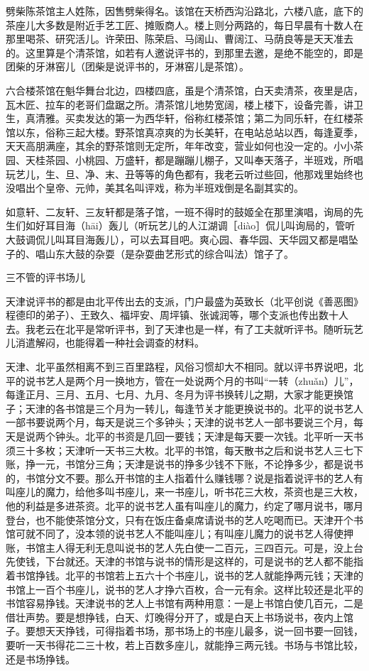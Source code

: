 \documentclass[12pt,UTF8]{ctexbook}
\begin{document}
劈柴陈茶馆主人姓陈，因售劈柴得名。该馆在天桥西沟沿路北，六楼八底，底下的茶座儿大多数是附近手艺工匠、摊贩商人。楼上则分两路的，每日早晨有十数人在那里喝茶、研究活儿。许荣田、陈荣启、马阔山、曹阔江、马荫良等是天天准去的。这里算是个清茶馆，如若有人邀说评书的，到那里去邀，是绝不能空的，即是团柴的牙淋窑儿（团柴是说评书的，牙淋窑儿是茶馆）。

六合楼茶馆在魁华舞台北边，四楼四底，虽是个清茶馆，白天卖清茶，夜里是店，瓦木匠、拉车的老哥们盘踞之所。清茶馆儿地势宽阔，楼上楼下，设备完善，讲卫生，真清雅。买卖发达的第一为西华轩，俗称红楼茶馆；第二为同乐轩，在红楼茶馆以东，俗称三起大楼。野茶馆真凉爽的为长美轩，在电站总站以西，每逢夏季，天天高朋满座，其余的野茶馆则无定所，年年改变，营业如何也没一定的。小小茶园、天桂茶园、小桃园、万盛轩，都是蹦蹦儿棚子，又叫奉天落子，半班戏，所唱玩艺儿，生、旦、净、末、丑等等的角色都有，我老云听过些回，他那戏里始终也没唱出个皇帝、元帅，美其名叫评戏，称为半班戏倒是名副其实的。

如意轩、二友轩、三友轩都是落子馆，一班不得时的鼓姬全在那里演唱，询局的先生们如好耳目海（hāi）轰儿（听玩艺儿的人江湖调［diào］侃儿叫询局的，管听大鼓调侃儿叫耳目海轰儿），可以去耳目吧。爽心园、春华园、天华园又都是唱坠子的、唱山东大鼓的杂耍（是杂耍曲艺形式的综合叫法）馆子了。





三不管的评书场儿


天津说评书的都是由北平传出去的支派，门户最盛为英致长（北平创说《善恶图》程德印的弟子）、王致久、福坪安、周坪镇、张诚润等，哪个支派也传出数十人去。我老云在北平是常听评书，到了天津也是一样，有了工夫就听评书。随听玩艺儿消遣解闷，也能得着一种社会调查的材料。

天津、北平虽然相离不到三百里路程，风俗习惯却大不相同。就以评书界说吧，北平的说书艺人是两个月一换地方，管在一处说两个月的书叫“一转（zhuǎn）儿”，每逢正月、三月、五月、七月、九月、冬月为评书换转儿之期，大家才能更换馆子；天津的各书馆是三个月为一转儿，每逢节关才能更换说书的。北平的说书艺人一部书要说两个月，每天是说三个多钟头；天津的说书艺人一部书要说三个月，每天是说两个钟头。北平的书资是几回一要钱；天津是每天要一次钱。北平听一天书须三十多枚；天津听一天书三大枚。北平的书馆，每天散书之后和说书艺人三七下账，挣一元，书馆分三角；天津是说书的挣多少钱不下账，不论挣多少，都是说书的，书馆分文不要。那么开书馆的主人指着什么赚钱哪？说是指着说评书的艺人有叫座儿的魔力，给他多叫书座儿，来一书座儿，听书花三大枚，茶资也是三大枚，他的利益是多进茶资。北平的说书艺人虽有叫座儿的魔力，约定了哪月说书，哪月登台，也不能使茶馆分文，只有在饭庄备桌席请说书的艺人吃喝而已。天津开个书馆可就不同了，没本领的说书艺人不能叫座儿；有叫座儿魔力的说书艺人得使押账，书馆主人得无利无息叫说书的艺人先白使一二百元，三四百元。可是，没上台先使钱，下台就还。天津的书馆与说书的情形是这样的，可是说书的艺人都不能指着书馆挣钱。北平的书馆若上五六十个书座儿，说书的艺人就能挣两元钱；天津的书馆上一百个书座儿，说书的艺人才挣六百枚，合一元有余。这样比较还是北平的书馆容易挣钱。天津说书的艺人上书馆有两种用意：一是上书馆白使几百元，二是借壮声势。要是想挣钱，白天、灯晚得分开了，或是白天上书场说书，夜内上馆子。要想天天挣钱，可得指着书场，那书场上的书座儿最多，说一回书要一回钱，要听一天书得花二三十枚，若上百数多座儿，就能挣三两元钱。书场与书馆比较，还是书场挣钱。
\end{document}
